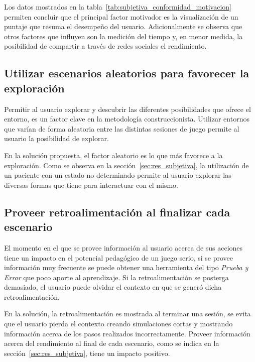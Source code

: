 Los datos mostrados en la tabla~\ref{tab:subjetiva_conformidad_motivacion}
permiten concluir que el principal factor motivador es la visualización de un
puntaje que resuma el desempeño del usuario. Adicionalmente se observa que otros
factores que influyen son la medición del tiempo y, en menor medida, la
posibilidad de compartir a través de redes sociales el rendimiento.

\subsection{Utilizar escenarios aleatorios para favorecer la exploración}

Permitir al usuario explorar y descubrir las diferentes posibilidades que ofrece
el entorno, es un factor clave en la metodología construccionista. Utilizar
entornos que varían de forma aleatoria entre las distintas sesiones de juego
permite al usuario la posibilidad de explorar.

En la solución propuesta, el factor aleatorio es lo que más favorece a la
exploración. Como se observa en la sección~\ref{sec:res_subjetiva}, la
utilización de un paciente con un estado no determinado permite al usuario
explorar las diversas formas que tiene para interactuar con el mismo.



\subsection{Proveer retroalimentación al finalizar cada escenario}

El momento en el que se provee información al usuario acerca de sus acciones
tiene un impacto en el potencial pedagógico de un juego serio, si se provee
información muy frecuente se puede obtener una herramienta del tipo \emph{Prueba
    y Error} que poco aporte al aprendizaje. Si la retroalimentación se posterga
demasiado, el usuario puede olvidar el contexto en que se generó dicha
retroalimentación.

En la solución, la retroalimentación es mostrada al terminar una sesión, se
evita que el usuario pierda el contexto creando simulaciones cortas y mostrando
información acerca de los pasos realizados incorrectamente. Proveer información
acerca del rendimiento al final de cada escenario, como se indica en la
sección~\ref{sec:res_subjetiva}, tiene un impacto positivo.

